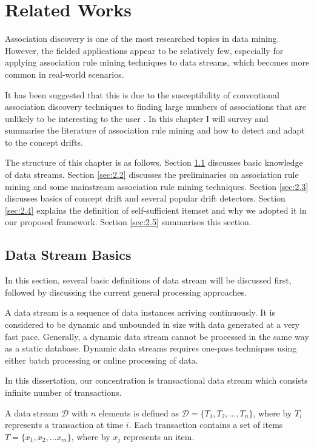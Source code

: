 \chapter{Related Works} \label{chapt:RelatedWorks}

Association discovery \cite{arm1} is one of the most researched topics in data mining. However, the fielded applications appear to be relatively few, especially for applying association rule mining techniques to data streams, which becomes more common in real-world scenarios.

It has been suggested that this is due to the susceptibility of conventional association discovery techniques to finding large numbers of associations that are unlikely to be interesting to the user \cite{topk}. In this chapter I will survey and summarise the literature of association rule mining and how to detect and adapt to the concept drifts.

The structure of this chapter is as follows. Section \ref{sec:2.1} discusses basic knowledge of data streams. Section \ref{sec:2.2} discusses the preliminaries on association rule mining and some mainstream association rule mining techniques. Section \ref{sec:2.3} discusses basics of concept drift and several popular drift detectors. Section \ref{sec:2.4} explains the definition of self-sufficient itemset and why we adopted it in our proposed framework. Section \ref{sec:2.5} summarises this section.


\section{Data Stream Basics}\label{sec:2.1}
In this section, several basic definitions of data stream will be discussed first, followed by discussing the current general processing approaches.

A data stream is a sequence of data instances arriving continuously. It is considered to be dynamic and unbounded in size with data generated at a very fast pace. Generally, a dynamic data stream cannot be processed in the same way as a static database. Dynamic data streams requires one-pass techniques using either batch processing or online processing of data.

In this dissertation, our concentration is transactional data stream which consists infinite number of transactions.

\begin{definition}
\label{datastream}
A data stream $\mathcal{D}$ with $n$ elements is defined as $\mathcal{D} = \{T_1, T_2, ..., T_n\}$, where by $T_i$ represents a transaction at time $i$. Each transaction contains a set of items $T = \{x_1, x_2, \ldots x_m\}$, where by $x_j$ represents an item. 
\end{definition}

